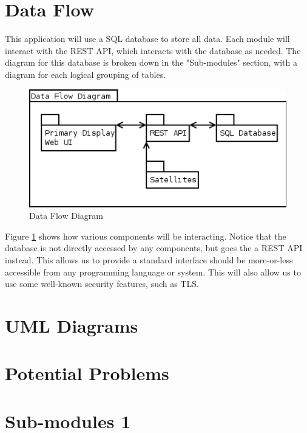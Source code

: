 \section{Data Flow}

This application will use a SQL database to store all data. Each module will interact with the REST API, which interacts with the database as needed. The diagram for this database is broken down in the "Sub-modules" section, with a diagram for each logical grouping of tables.

\begin{figure}
\centering
\includegraphics[scale=0.5]{Software/images/DataFlowDiagram.png}
\caption{Data Flow Diagram}
\label{DataFlowDiagram}
\end{figure}

Figure \ref{DataFlowDiagram} shows how various components will be interacting. Notice that the database is not directly accessed by any components, but goes the a REST API instead. This allows us to provide a standard interface should be more-or-less accessible from any programming language or system. This will also allow us to use some well-known security features, such as TLS.

\section{UML Diagrams}


\section{Potential Problems}


\section{Sub-modules 1}



